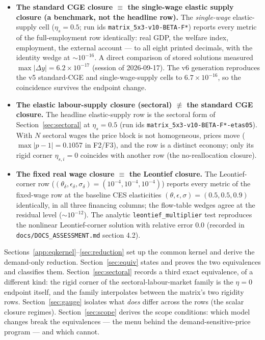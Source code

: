 \begin{itemize}
\item \textbf{The standard CGE closure $\equiv$ the single-wage elastic
      supply closure (a benchmark, not the headline row).} The
      \emph{single-wage} elastic-supply cell
      ($\eta_s = 0.5$; run ids \texttt{matrix\_5x3-v10-BETA-F*}) reports
      every metric of the full-employment row
      identically: real GDP, the welfare index, employment, the external
      account --- to all eight printed decimals, with the identity wedge at
      $\sim 10^{-16}$. A direct comparison of stored solutions measured
      $\max|\Delta y| = 6.2\times 10^{-17}$ (session of 2026-09-17).
      The v6 generation reproduces the v5 standard-CGE and
      single-wage-supply cells to $6.7\times 10^{-16}$, so the coincidence
      survives the endpoint
      change.
\item \textbf{The elastic labour-supply closure (sectoral)
      $\not\equiv$ the standard CGE closure.} The headline
      elastic-supply row is the sectoral form of Section~\ref{sec:sectoral}
      at
      $\eta_s = 0.5$ (run ids \texttt{matrix\_5x3-v10-BETA-F*-etas05}). With
      $N$ sectoral wages the price block is not homogeneous, prices move
      ($\max|p-1| = 0.1057$ in F2/F3), and the row is a distinct economy;
      only its rigid corner $\eta_{s,i}=0$ coincides with another row (the
      no-reallocation closure).
\item \textbf{The fixed real wage closure $\equiv$ the Leontief closure.}
      The Leontief-corner row
      ($( \theta_\delta, \epsilon_\delta, \sigma_\delta ) = (10^{-4},
      10^{-4}, 10^{-4})$) reports every metric of the fixed-wage row at the
      baseline CES elasticities $(\theta,\epsilon,\sigma) = (0.5,0.5,0.9)$
      identically, in all three financing columns; the flow-table wedges
      agree at the residual level ($\sim 10^{-12}$). The analytic
      \texttt{leontief\_multiplier} test reproduces the nonlinear
      Leontief-corner solution with relative error $0.0$ (recorded in
      \texttt{docs/DOCS\_ASSESSMENT.md} section 4.2).
\end{itemize}

Sections~\ref{app:eqkernel}--\ref{sec:reduction} set up the common kernel and
derive the demand-only reduction. Section~\ref{sec:equiv} states and proves
the two equivalences and classifies them.
Section~\ref{sec:sectoral} records a third exact
equivalence, of a different kind: the rigid corner of the sectoral-labour-market
family is the $\eta = 0$ endpoint itself, and the family interpolates between the
matrix's two rigidity rows. Section~\ref{sec:gauge} isolates
what \emph{does} differ across the rows (the scalar closure regimes).
Section~\ref{sec:scope} derives the scope conditions: which model changes
break the equivalences --- the menu behind the demand-sensitive-price program
--- and which cannot.

